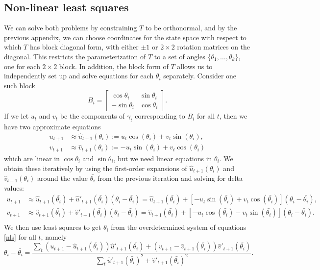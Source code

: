 \documentclass[12pt,leqno]{article}
\begin{document}
\subsection{Non-linear least squares}
We can solve both problems by constraining $T$ to be
orthonormal, and by the previous appendix, we can choose coordinates for the state space with respect to which
$T$ has block diagonal form, with either $\pm 1$ or $2\times 2$ rotation matrices on the diagonal.  This restricts the
parameterization of $T$ to a set of angles $\{\theta_1,\dots,\theta_k\}$, one for each $2\times 2$ block.  In addition,
the block form of $T$ allows us to independently set up and solve equations for each $\theta_i$ separately.  Consider
one such block
$$
B_i = \left[\begin{matrix} \cos\theta_i & \sin\theta_i \\ -\sin\theta_i & \cos\theta_i\end{matrix}\right].
$$
If we let $u_t$ and $v_t$ be the components of $\gamma_t$ corresponding to $B_i$ for all $t$, then we have two
approximate equations
\begin{align*}
  u_{t+1} &\approx \hat{u}_{t+1}(\theta_i) := u_t\cos(\theta_i)  + v_t\sin(\theta_i),\\
  v_{t+1} &\approx \hat{v}_{t+1}(\theta_i) := -u_t\sin(\theta_i ) + v_t\cos(\theta_i) 
\end{align*}
which are linear in $\cos\theta_i$ and $\sin\theta_i$, but we need linear equations in $\theta_i$.  We obtain these
iteratively by using the first-order expansions of $\hat{u}_{t+1}(\theta_i)$ and $\hat{v}_{t+1}(\theta_i)$ around the value
$\bar{\theta_i}$ from the previous iteration and solving for delta values:
\begin{equation}\label{nls}
  \begin{split}
    u_{t+1}&\approx  \hat{u}_{t+1}(\bar{\theta_i}) + \hat{u}'_{t+1}(\bar{\theta_i})(\theta_i-\bar{\theta_i}) =\hat{u}_{t+1}(\bar{\theta_i})+  [-u_t\sin(\bar{\theta_i})+ v_t\cos(\bar{\theta_i})] (\theta_i-\bar{\theta_i}) ,\\
     v_{t+1} &\approx  \hat{v}_{t+1}(\bar{\theta_i})  + \hat{v}'_{t+1}(\bar{\theta_i})(\theta_i-\bar{\theta_i})
       = \hat{v}_{t+1}(\bar{\theta_i}) + [-u_t\cos(\bar{\theta_i}) - v_t\sin(\bar{\theta_i})] (\theta_i-\bar{\theta_i}).\\
  \end{split}
\end{equation}
We then use least squares to get  $\theta_i$ from the overdetermined system of equations \eqref{nls} for all $t$,
namely
$$
\theta_i-\bar{\theta_i} = \frac{\sum_t (u_{t+1}-\hat{u}_{t+1}(\bar{\theta_i}))\hat{u}'_{t+1}(\bar{\theta_i})+
  (v_{t+1}-\hat{v}_{t+1}(\bar{\theta_i}))\hat{v}'_{t+1}(\bar{\theta_i})}{\sum_t\hat{u}'_{t+1}(\bar{\theta_i})^2 +
\hat{v}'_{t+1}(\bar{\theta_i})^2}.
$$
\end{document}
